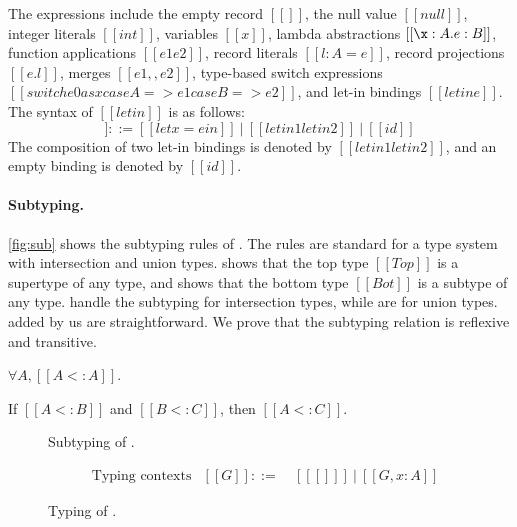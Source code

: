 The expressions include the empty record $[[{}]]$, the null value $[[null]]$,
integer literals $[[int]]$, variables $[[x]]$, lambda abstractions $[[\x:A. e:B]]$,
function applications $[[e1 e2]]$, record literals $[[{l : A = e}]]$, record
projections $[[e.l]]$, merges $[[e1 ,, e2]]$, type-based switch expressions
$[[switch e0 as x case A => e1 case B => e2]]$, and let-in bindings $[[letin e]]$.
The syntax of $[[letin]]$ is as follows:
\begin{equation*}
  [[letin]] ::= [[let x = e in]] ~|~ [[letin1 letin2]] ~|~ [[id]]
\end{equation*}
The composition of two let-in bindings is denoted by $[[letin1 letin2]]$, and an
empty binding is denoted by $[[id]]$.

\paragraph{Subtyping.}
\autoref{fig:sub} shows the subtyping rules of \lambdaiu. The rules are standard
for a type system with intersection and union types.  shows that
the top type $[[Top]]$ is a supertype of any type, and  shows that
the bottom type $[[Bot]]$ is a subtype of any type.
 handle the subtyping for intersection types,
while  are for union types. 
added by us are straightforward. We prove that the subtyping relation is
reflexive and transitive.

\begin{theorem}
  $\forall A, [[A <: A]]$.
\end{theorem}
\begin{theorem}
  If $[[A <: B]]$ and $[[B <: C]]$, then $[[A <: C]]$.
\end{theorem}

\begin{figure}[b!]
\IUdefnsub{}
\caption{Subtyping of \lambdaiu.} \label{fig:sub}
\end{figure}

\begin{figure}
\begin{align*}
  &\text{Typing contexts}&[[G]] ::=&~ [[ [] ]] ~|~ [[G, x : A]]
\end{align*}
\IUdefntyping{}
\IUdefnletbind{}
\caption{Typing of \lambdaiu.} \label{fig:typ}
\end{figure}

